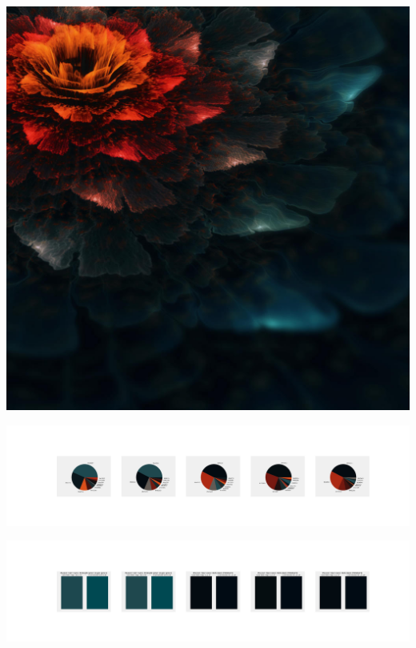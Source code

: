 \documentclass[11pt]{article}
\begin{document}
\begin{landscape}
    \begin{center}
    \includegraphics[width=\textwidth]{./nbimg/file (164).jpg}
    \end{center}

    \begin{center}
    \includegraphics[width=250mm]{./nbimg/pie-72.jpg}
    \end{center}

    \begin{center}
    \includegraphics[width=250mm]{./nbimg/peak-72.jpg}
    \end{center}
    


\end{landscape}
\end{document}
